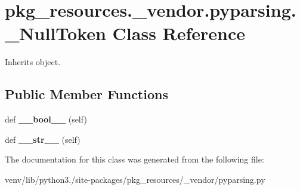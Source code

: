 \hypertarget{classpkg__resources_1_1__vendor_1_1pyparsing_1_1___null_token}{}\section{pkg\+\_\+resources.\+\_\+vendor.\+pyparsing.\+\_\+\+Null\+Token Class Reference}
\label{classpkg__resources_1_1__vendor_1_1pyparsing_1_1___null_token}


Inherits object.

\subsection*{Public Member Functions}
\begin{DoxyCompactItemize}
\item 
\mbox{\label{classpkg__resources_1_1__vendor_1_1pyparsing_1_1___null_token_a2b5f3999cadafb512f3a5a757f968d79}} 
def {\bfseries \+\_\+\+\_\+bool\+\_\+\+\_\+} (self)
\item 
\mbox{\label{classpkg__resources_1_1__vendor_1_1pyparsing_1_1___null_token_ac99fb1bfc48ee82cef8a545c5b76dd7b}} 
def {\bfseries \+\_\+\+\_\+str\+\_\+\+\_\+} (self)
\end{DoxyCompactItemize}


The documentation for this class was generated from the following file\+:\begin{DoxyCompactItemize}
\item 
venv/lib/python3./site-\/packages/pkg\+\_\+resources/\+\_\+vendor/pyparsing.\+py\end{DoxyCompactItemize}
